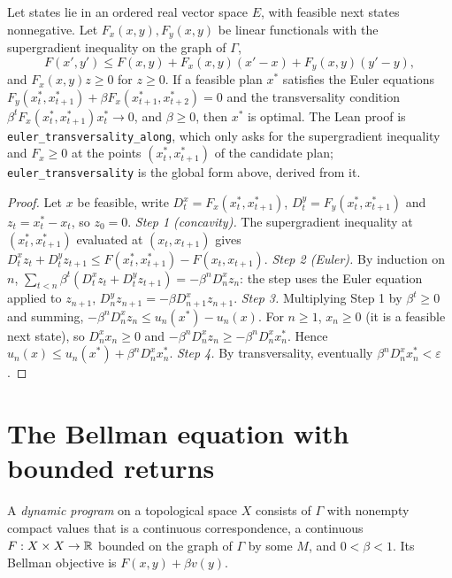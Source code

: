 \begin{theorem}
\label{thm:euler_transversality}
\leanok
{}
Let states lie in an ordered real vector space $E$, with feasible next states nonnegative. Let
$F_x(x, y), F_y(x, y)$ be linear functionals with the supergradient inequality on the graph of $\Gamma$,
\[
  F(x', y') \le F(x, y) + F_x(x, y)(x' - x) + F_y(x, y)(y' - y),
\]
and $F_x(x, y) z \ge 0$ for $z \ge 0$. If a feasible plan $x^*$ satisfies the Euler equations
$F_y(x^*_t, x^*_{t+1}) + \beta F_x(x^*_{t+1}, x^*_{t+2}) = 0$ and the transversality condition
$\beta^t F_x(x^*_t, x^*_{t+1}) x^*_t \to 0$, and $\beta \ge 0$, then $x^*$ is optimal.
The Lean proof is \texttt{euler\_transversality\_along}, which only asks for the supergradient inequality and
$F_x \ge 0$ at the points $(x^*_t, x^*_{t+1})$ of the candidate plan; \texttt{euler\_transversality} is the
global form above, derived from it.
\end{theorem}
\begin{proof}
\leanok
Let $x$ be feasible, write $D^x_t = F_x(x^*_t, x^*_{t+1})$, $D^y_t = F_y(x^*_t, x^*_{t+1})$ and
$z_t = x^*_t - x_t$, so $z_0 = 0$.
\emph{Step 1 (concavity).} The supergradient inequality at $(x^*_t, x^*_{t+1})$ evaluated at
$(x_t, x_{t+1})$ gives $D^x_t z_t + D^y_t z_{t+1} \le F(x^*_t, x^*_{t+1}) - F(x_t, x_{t+1})$.
\emph{Step 2 (Euler).} By induction on $n$,
$\sum_{t<n} \beta^t (D^x_t z_t + D^y_t z_{t+1}) = -\beta^n D^x_n z_n$: the step uses the Euler equation
applied to $z_{n+1}$, $D^y_n z_{n+1} = -\beta D^x_{n+1} z_{n+1}$.
\emph{Step 3.} Multiplying Step 1 by $\beta^t \ge 0$ and summing,
$-\beta^n D^x_n z_n \le u_n(x^*) - u_n(x)$. For $n \ge 1$, $x_n \ge 0$ (it is a feasible next state), so
$D^x_n x_n \ge 0$ and $-\beta^n D^x_n z_n \ge -\beta^n D^x_n x^*_n$. Hence
$u_n(x) \le u_n(x^*) + \beta^n D^x_n x^*_n$.
\emph{Step 4.} By transversality, eventually $\beta^n D^x_n x^*_n < \varepsilon$.
\end{proof}

\section{The Bellman equation with bounded returns}
\label{sec:bellman}

\begin{definition}
\label{def:DynProg}
\leanok
{}
A \emph{dynamic program} on a topological space $X$ consists of $\Gamma$ with nonempty compact values that
is a continuous correspondence, a continuous $F : X \times X \to \mathbb{R}$ bounded on the graph of $\Gamma$ by
some $M$, and $0 < \beta < 1$. Its Bellman objective is $F(x, y) + \beta v(y)$.
\end{definition}

